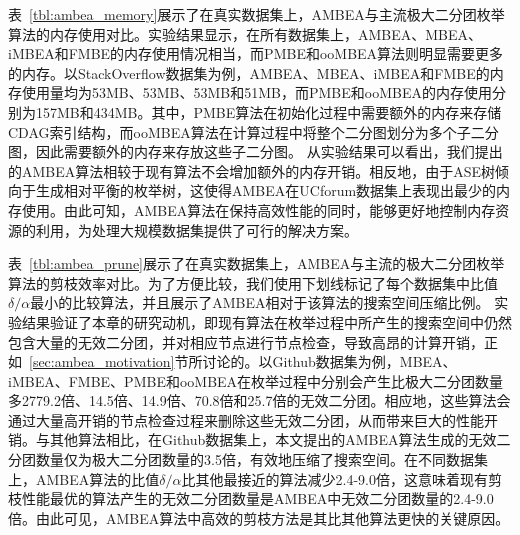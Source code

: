 


表~\ref{tbl:ambea_memory}展示了在真实数据集上，AMBEA与主流极大二分团枚举算法的内存使用对比。实验结果显示，在所有数据集上，AMBEA、MBEA、iMBEA和FMBE的内存使用情况相当，而PMBE和ooMBEA算法则明显需要更多的内存。以StackOverflow数据集为例，AMBEA、MBEA、iMBEA和FMBE的内存使用量均为53MB、53MB、53MB和51MB，而PMBE和ooMBEA的内存使用分别为157MB和434MB。其中，PMBE算法在初始化过程中需要额外的内存来存储CDAG索引结构，而ooMBEA算法在计算过程中将整个二分图划分为多个子二分图，因此需要额外的内存来存放这些子二分图。
从实验结果可以看出，我们提出的AMBEA算法相较于现有算法不会增加额外的内存开销。相反地，由于ASE树倾向于生成相对平衡的枚举树，这使得AMBEA在UCforum数据集上表现出最少的内存使用。由此可知，AMBEA算法在保持高效性能的同时，能够更好地控制内存资源的利用，为处理大规模数据集提供了可行的解决方案。





表~\ref{tbl:ambea_prune}展示了在真实数据集上，AMBEA与主流的极大二分团枚举算法的剪枝效率对比。为了方便比较，我们使用下划线标记了每个数据集中比值$\delta/\alpha$最小的比较算法，并且展示了AMBEA相对于该算法的搜索空间压缩比例。
实验结果验证了本章的研究动机，即现有算法在枚举过程中所产生的搜索空间中仍然包含大量的无效二分团，并对相应节点进行节点检查，导致高昂的计算开销，正如~\ref{sec:ambea_motivation}节所讨论的。以Github数据集为例，MBEA、iMBEA、FMBE、PMBE和ooMBEA在枚举过程中分别会产生比极大二分团数量多2779.2倍、14.5倍、14.9倍、70.8倍和25.7倍的无效二分团。相应地，这些算法会通过大量高开销的节点检查过程来删除这些无效二分团，从而带来巨大的性能开销。与其他算法相比，在Github数据集上，本文提出的AMBEA算法生成的无效二分团数量仅为极大二分团数量的3.5倍，有效地压缩了搜索空间。在不同数据集上，AMBEA算法的比值$\delta/\alpha$比其他最接近的算法减少2.4-9.0倍，这意味着现有剪枝性能最优的算法产生的无效二分团数量是AMBEA中无效二分团数量的2.4-9.0倍。由此可见，AMBEA算法中高效的剪枝方法是其比其他算法更快的关键原因。




